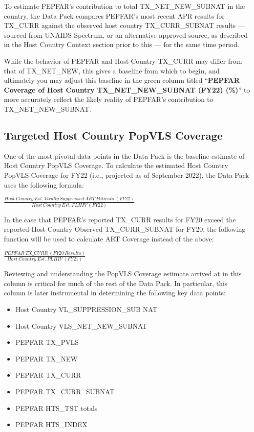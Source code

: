 \documentclass[
  openany]{book}
\begin{document}
To estimate PEPFAR's contribution to total TX\_NET\_NEW\_SUBNAT in the
country, the Data Pack compares PEPFAR's most recent APR results for
TX\_CURR against the observed host country TX\_CURR\_SUBNAT results ---
sourced from UNAIDS Spectrum, or an alternative approved source, as
described in the Host Country Context section prior to this --- for the
same time period.

While the behavior of PEPFAR and Host Country TX\_CURR may differ from
that of TX\_NET\_NEW, this gives a baseline from which to begin, and
ultimately you may adjust this baseline in the green column titled
``\textbf{PEPFAR Coverage of Host Country TX\_NET\_NEW\_SUBNAT (FY22) (\%)}'' to
more accurately reflect the likely reality of PEPFAR's contribution to
TX\_NET\_NEW\_SUBNAT.

\hypertarget{targeted-host-country-popvls-coverage}{%
\subsection{Targeted Host Country PopVLS Coverage}\label{targeted-host-country-popvls-coverage}}

One of the most pivotal data points in the Data Pack is the baseline
estimate of Host Country PopVLS Coverage. To calculate the estimated
Host Country PopVLS Coverage for FY22 (i.e., projected as of September
2022), the Data Pack uses the following formula:

\begin{center}

$\frac{Host\ Country\ Est.\ Virally\ Suppressed\ ART\ Patients\ (FY22)}{Host\ Country\ Est.\ PLHIV\ (FY22)}$ 

\end{center}

In the case that PEPFAR's reported TX\_CURR results for FY20 exceed the
reported Host Country Observed TX\_CURR\_SUBNAT for FY20, the following
function will be used to calculate ART Coverage instead of the above:

\begin{center} $\frac{PEPFAR\ TX\_ CURR\ (FY20\ Results)}{Host\ Country\ Est.\ PLHIV\ (FY21)}$ \end{center}

Reviewing and understanding the PopVLS Coverage estimate arrived at in
this column is critical for much of the rest of the Data Pack. In
particular, this column is later instrumental in determining the
following key data points:

\begin{itemize}
\item
  Host Country VL\_SUPPRESSION\_SUB NAT
\item
  Host Country VLS\_NET\_NEW\_SUBNAT
\item
  PEPFAR TX\_PVLS
\item
  PEPFAR TX\_NEW
\item
  PEPFAR TX\_CURR
\item
  PEPFAR TX\_CURR\_SUBNAT
\item
  PEPFAR HTS\_TST totals
\item
  PEPFAR HTS\_INDEX
\end{itemize}
\end{document}
